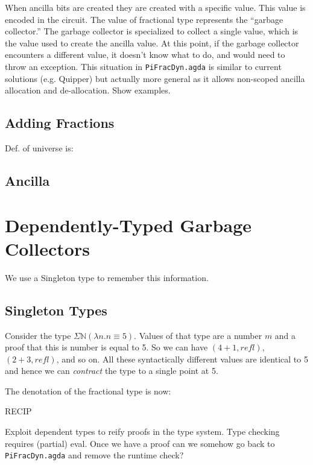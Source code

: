 \documentclass[sigplan,10pt,review,anonymous]{acmart}
\begin{document}
When ancilla bits are created they are created with a specific
value. This value is encoded in the circuit. The value of fractional
type represents the ``garbage collector.''  The garbage collector is
specialized to collect a single value, which is the value used to
create the ancilla value. At this point, if the garbage collector
encounters a different value, it doesn't know what to do, and would
need to throw an exception. This situation in \verb|PiFracDyn.agda| is
similar to current solutions (e.g. Quipper) but actually more general
as it allows non-scoped ancilla allocation and de-allocation. Show
examples.

\subsection{Adding Fractions}

Def. of universe is:

\Udef{}

\subsection{Ancilla}

\section{Dependently-Typed Garbage Collectors}

We use a Singleton type
to remember this information. 

\subsection{Singleton Types}

Consider the type $\Sigma \mathbb{N} (\lambda n. n \equiv 5)$. Values
of that type are a number $m$ and a proof that this is number is equal
to 5. So we can have $(4 + 1, \textit{refl})$, $(2 + 3 ,
\textit{refl})$, and so on. All these syntactically different values
are identical to 5 and hence we can \emph{contract} the type to a
single point at 5. 

The denotation of the fractional type is now:

RECIP 

Exploit dependent types to reify proofs in the type system. Type
checking requires (partial) eval. Once we have a proof can we somehow
go back to \verb|PiFracDyn.agda| and remove the runtime check?
\end{document}
